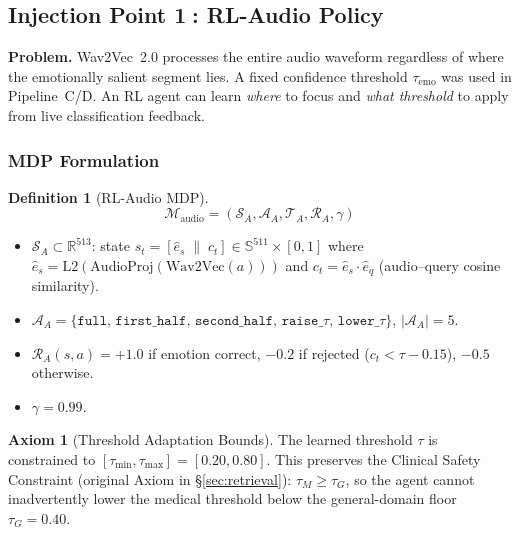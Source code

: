 \documentclass[12pt,a4paper]{article}
\theoremstyle{definition}
\newtheorem{definition}{Definition}[section]
\newtheorem{axiom}{Axiom}[section]
\theoremstyle{plain}
\theoremstyle{remark}
\newcommand{\R}{\mathbb{R}}
\newcommand{\Sph}{\mathbb{S}}
\begin{document}
\subsection{Injection Point \textcircled{1}: RL-Audio Policy}
\label{sec:rl_audio}

\begin{tcolorbox}[rlinjbox,title={Injection \textcircled{1} --- RL-Audio}]
\textbf{Problem.}
Wav2Vec~2.0 processes the entire audio waveform regardless of where the
emotionally salient segment lies.  A fixed confidence threshold $\tau_{\text{emo}}$
was used in Pipeline~C/D.  An RL agent can learn \emph{where} to focus and
\emph{what threshold} to apply from live classification feedback.
\end{tcolorbox}

\subsubsection{MDP Formulation}

\begin{definition}[RL-Audio MDP]
\label{def:rl_audio_mdp}
\[
  \mathcal{M}_{\text{audio}} = (\mathcal{S}_A,\mathcal{A}_A,\mathcal{T}_A,\mathcal{R}_A,\gamma)
\]
\begin{itemize}[nosep]
  \item $\mathcal{S}_A \subset \R^{513}$:
        state $s_t = [\hat{e}_s \;\|\; c_t] \in \Sph^{511}\times[0,1]$
        where $\hat{e}_s = \mathrm{L2}(\text{AudioProj}(\text{Wav2Vec}(a)))$
        and $c_t = \hat{e}_s \cdot \hat{e}_q$ (audio--query cosine similarity).
  \item $\mathcal{A}_A = \{\texttt{full},\,\texttt{first\_half},\,
        \texttt{second\_half},\,\texttt{raise\_}\tau,\,\texttt{lower\_}\tau\}$,
        $|\mathcal{A}_A|=5$.
  \item $\mathcal{R}_A(s,a) = +1.0$ if emotion correct,
        $-0.2$ if rejected ($c_t < \tau - 0.15$),
        $-0.5$ otherwise.
  \item $\gamma = 0.99$.
\end{itemize}
\end{definition}

\begin{axiom}[Threshold Adaptation Bounds]
\label{ax:tau_bounds}
The learned threshold $\tau$ is constrained to $[\tau_{\min},\tau_{\max}]=[0.20,0.80]$.
This preserves the Clinical Safety Constraint (original Axiom in \S\ref{sec:retrieval}):
$\tau_M \ge \tau_G$, so the agent cannot inadvertently lower the medical threshold
below the general-domain floor $\tau_G=0.40$.
\end{axiom}
\end{document}
